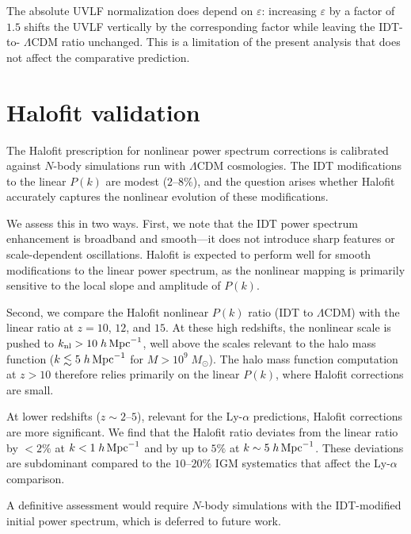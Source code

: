 \documentclass[aps,prd,twocolumn,superscriptaddress,nofootinbib]{revtex4-2}
\begin{document}
The absolute UVLF normalization does depend on $\varepsilon$:
increasing $\varepsilon$ by a factor of $1.5$ shifts the UVLF
vertically by the corresponding factor while leaving the IDT-to-%
$\Lambda$CDM ratio unchanged. This is a limitation of the present
analysis that does not affect the comparative prediction.


\section{Halofit validation}
\label{app:halofit}

The Halofit prescription for nonlinear power spectrum corrections
is calibrated against $N$-body simulations run with $\Lambda$CDM
cosmologies. The IDT modifications to the linear $P(k)$ are modest
($2$--$8\%$), and the question arises whether Halofit accurately
captures the nonlinear evolution of these modifications.

We assess this in two ways. First, we note that the IDT power
spectrum enhancement is broadband and smooth---it does not introduce
sharp features or scale-dependent oscillations. Halofit is expected
to perform well for smooth modifications to the linear power
spectrum, as the nonlinear mapping is primarily sensitive to the
local slope and amplitude of $P(k)$.

Second, we compare the Halofit nonlinear $P(k)$ ratio (IDT to
$\Lambda$CDM) with the linear ratio at $z = 10$, $12$, and $15$.
At these high redshifts, the nonlinear scale is pushed to
$k_{\rm nl} > 10\;h\,{\rm Mpc}^{-1}$, well above the scales
relevant to the halo mass function ($k \lesssim 5\;h\,
{\rm Mpc}^{-1}$ for $M > 10^9\;M_\odot$). The halo mass function
computation at $z > 10$ therefore relies primarily on the linear
$P(k)$, where Halofit corrections are small.

At lower redshifts ($z \sim 2$--$5$), relevant for the Ly-$\alpha$
predictions, Halofit corrections are more significant. We find that
the Halofit ratio deviates from the linear ratio by $< 2\%$ at
$k < 1\;h\,{\rm Mpc}^{-1}$ and by up to $5\%$ at
$k \sim 5\;h\,{\rm Mpc}^{-1}$. These deviations are subdominant
compared to the $10$--$20\%$ IGM systematics that affect the
Ly-$\alpha$ comparison.

A definitive assessment would require $N$-body simulations with the
IDT-modified initial power spectrum, which is deferred to future
work.
\end{document}
